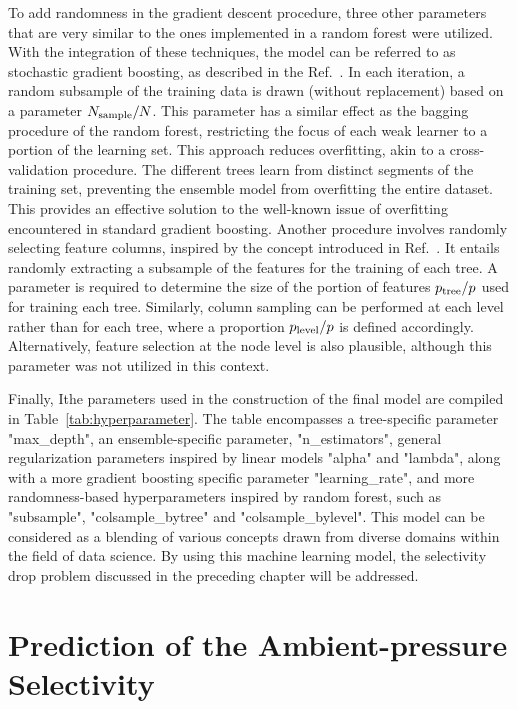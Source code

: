 \documentclass[main]{subfiles}
\begin{document}
To add randomness in the gradient descent procedure, three other parameters that are very similar to the ones implemented in a random forest were utilized. With the integration of these techniques, the model can be referred to as stochastic gradient boosting, as described in the Ref.~\cite{Friedman2002}. In each iteration, a random subsample of the training data is drawn (without replacement) based on a parameter $N_{\text{sample}}/N$. This parameter has a similar effect as the bagging procedure of the random forest, restricting the focus of each weak learner to a portion of the learning set. This approach reduces overfitting, akin to a cross-validation procedure. The different trees learn from distinct segments of the training set, preventing the ensemble model from overfitting the entire dataset. This provides an effective solution to the well-known issue of overfitting encountered in standard gradient boosting. Another procedure involves randomly selecting feature columns, inspired by the concept introduced in Ref.~\cite{Tin_Kam_Ho_1998}. It entails randomly extracting a subsample of the features for the training of each tree. A parameter is required to determine the size of the portion of features  $p_{\text{tree}}/p$ used for training each tree. Similarly, column sampling can be performed at each level rather than for each tree, where a proportion $p_{\text{level}}/p$ is defined accordingly. Alternatively, feature selection at the node level is also plausible, although this parameter was not utilized in this context.

Finally, Ithe parameters used in the construction of the final model are compiled in Table~\ref{tab:hyperparameter}. The table encompasses a tree-specific parameter "max\_depth", an ensemble-specific parameter, "n\_estimators", general regularization parameters inspired by linear models "alpha" and "lambda", along with a more gradient boosting specific parameter "learning\_rate", and more randomness-based hyperparameters inspired by random forest, such as "subsample", "colsample\_bytree" and "colsample\_bylevel". This model can be considered as a blending of various concepts drawn from diverse domains within the field of data science. By using this machine learning model, the selectivity drop problem discussed in the preceding chapter will be addressed.

\section{Prediction of the Ambient-pressure Selectivity}
\end{document}
